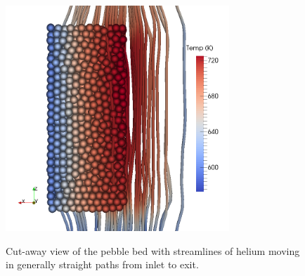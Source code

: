 \begin{figure}[t]
	\centering
	\caption{Cut-away view of the pebble bed with streamlines of helium moving in generally straight paths from inlet to exit.}
	\includegraphics[width=0.75\textwidth]{chapters/figures/cfd-dem-streamlines2}\label{fig:cfdem-streamlines}
\end{figure}




